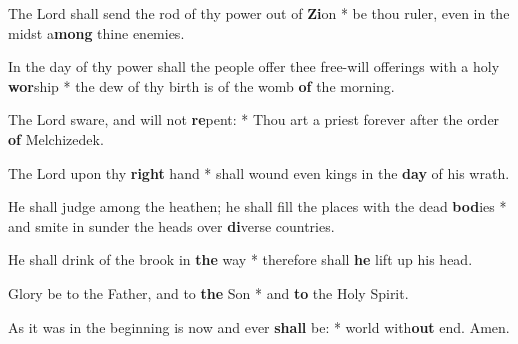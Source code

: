 \begin{multicols}{2}
	The Lord shall send the rod of thy power out of \textbf{Zi}on * be thou ruler, even in the midst a\textbf{mong} thine enemies.
	
	In the day of thy power shall the people offer thee free-will offerings with a holy \textbf{wor}ship * the dew of thy birth is of the womb \textbf{of} the morning.
	
	The Lord sware, and will not \textbf{re}pent: * Thou art a priest forever after the order \textbf{of} Melchizedek.
	
	The Lord upon thy \textbf{right} hand * shall wound even kings in the \textbf{day} of his wrath.
	
	He shall judge among the heathen; he shall fill the places with the dead \textbf{bod}ies * and smite in sunder the heads over \textbf{di}verse countries.
	
	He shall drink of the brook in \textbf{the} way * therefore shall \textbf{he} lift up his head.
	
	Glory be to the Father, and to \textbf{the} Son * and \textbf{to} the Holy Spirit.
	
	As it was in the beginning is now and ever \textbf{shall} be: * world with\textbf{out} end. Amen.
\end{multicols}